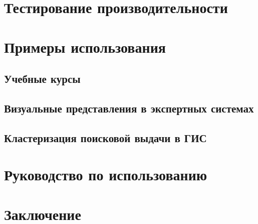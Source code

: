 \documentclass[a4paper,14pt,russian,nocolumnsxix,nocolumnxxxii,nocolumnxxxi,hpadding=10mm]{eskdtext}
\begin{document}
  
  \newpage

  \section{Тестирование производительности} %
  \section{Примеры использования} %
  \subsection{Учебные курсы}
  \subsection{Визуальные представления в экспертных системах}
  \subsection{Кластеризация поисковой выдачи в ГИС}
  \section{Руководство по использованию} %
  \section{Заключение} %
  \newpage
  \tableofcontents 
\end{document}
